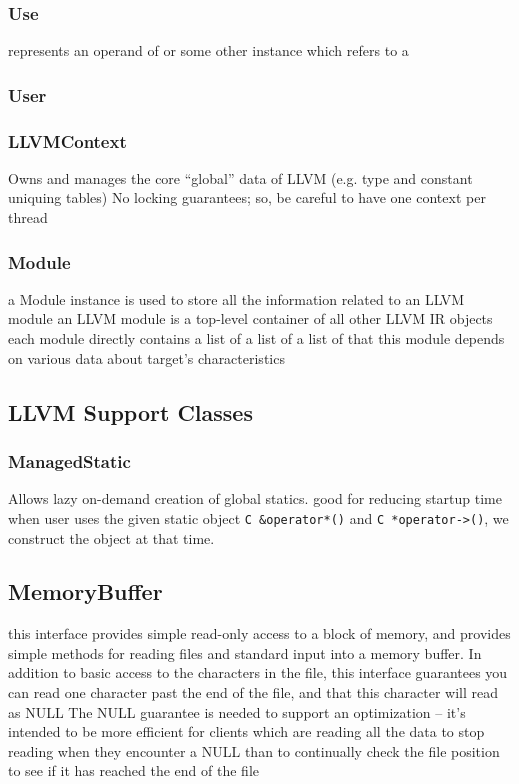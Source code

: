 \documentclass{myproc}
\begin{document}
\subsubsection{Use}
\bit
\w {} represents an operand of  or some other 
instance which refers to a 
\eit
\subsubsection{User}
\subsubsection{LLVMContext}
\bit
\w Owns and manages the core ``global'' data of LLVM (e.g. type and constant
uniquing tables) 
\w No locking guarantees; so, be careful to have one context per thread
\eit

\subsubsection{Module}
\bit
\w a Module instance is used to store all the information related to an LLVM
module
\w  an LLVM module is a top-level container of all other LLVM IR objects 
\w each module directly contains
  \bit
  \w a list of 
  \w a list of 
  \w a list of  that this module depends on
  \w {}
  \w various data about target's characteristics
  \eit
\eit


\subsection{LLVM Support Classes}
\subsubsection{ManagedStatic}
\bit
\w Allows lazy on-demand creation of global statics.
\w good for reducing startup time
\w when user uses the given static object \verb+C &operator*()+ and
\verb+C *operator->()+, we construct the object at that time.
\eit

\subsection{MemoryBuffer}
\bit
\w this interface provides simple read-only access to a block of memory, and
provides simple methods for reading files and standard input  into a memory
buffer.  In addition to basic access to the characters in the  file, this
interface guarantees you can read one character past the end of  the file, and
that this character will read as NULL
\w  The NULL guarantee is needed to support an optimization -- it's intended
to be more efficient for clients which are reading all the data to stop
reading when they encounter a NULL than to continually check the file position to see if it has reached the end of the file
\eit
\end{document}
